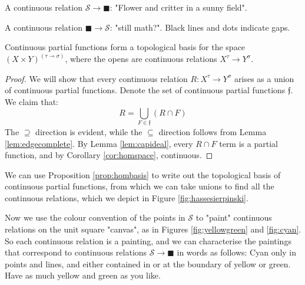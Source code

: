 \begin{marginfigure}
\centering
{}
\caption{A continuous relation $\mathcal{S} \rightarrow \blacksquare$: "Flower and critter in a sunny field".}
\label{fig:flower}
\end{marginfigure}

\begin{marginfigure}
\centering
{}
\caption{A continuous relation $\blacksquare \rightarrow \mathcal{S}$: "still math?". Black lines and dots indicate gaps.}
\label{fig:shitpost}
\end{marginfigure}

\begin{proposition}\label{prop:hombasis}
Continuous partial functions form a topological basis for the space $(X \times Y)^{(\tau \multimap \sigma)}$, where the opens are continuous relations $X^\tau \rightarrow Y^\sigma$.
\begin{proof}
We will show that every continuous relation $R: X^\tau \rightarrow Y^\sigma$ arises as a union of continuous partial functions. Denote the set of continuous partial functions $\mathfrak{f}$. We claim that:
\[ R = \bigcup\limits_{F \in \mathfrak{f}} (R \cap F) \]
The $\supseteq$ direction is evident, while the $\subseteq$ direction follows from Lemma \ref{lem:edgecomplete}.
By Lemma \ref{lem:capideal}, every $R \cap F$ term is a partial function, and by Corollary \ref{cor:homspace}, continuous.
\end{proof}
\end{proposition}

 We can use Proposition \ref{prop:hombasis} to write out the topological basis of continuous partial functions, from which we can take unions to find all the continuous relations, which we depict in Figure \ref{fig:hassesierpinski}.

Now we use the colour convention of the points in $\mathcal{S}$ to "paint" continuous relations on the unit square "canvas", as in Figures \ref{fig:yellowgreen} and \ref{fig:cyan}. So each continuous relation is a painting, and we can characterise the paintings that correspond to continuous relations $\mathcal{S} \rightarrow \blacksquare$ in words as follows: Cyan only in points and lines, and either contained in or at the boundary of yellow or green. Have as much yellow and green as you like.


